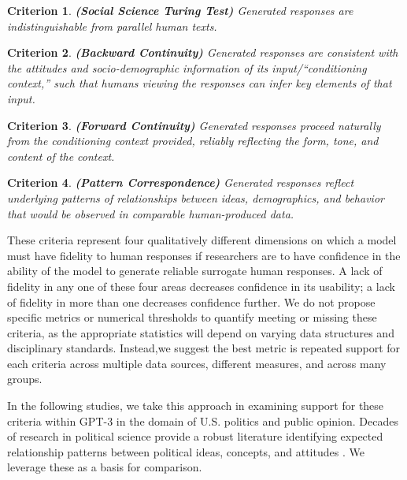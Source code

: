 \documentclass[11pt]{article}
\newtheorem{criterion}{Criterion}
\begin{document}
\begin{criterion}
\textbf{(Social Science Turing Test)} Generated responses are indistinguishable from parallel human texts.
\end{criterion}

\begin{criterion}
\textbf{(Backward Continuity)} Generated responses are consistent with the attitudes and socio-demographic information of its input/``conditioning context,'' such that  humans viewing the responses can infer key elements of that input.
\end{criterion}

\begin{criterion}
\textbf{(Forward Continuity)} Generated responses proceed naturally from the conditioning context provided, reliably reflecting the form, tone, and content of the context.
\end{criterion}

\begin{criterion}
\textbf{(Pattern Correspondence)}
Generated responses reflect underlying patterns of relationships between ideas, demographics, and behavior that would be observed in comparable human-produced data.
\end{criterion}


These criteria represent four qualitatively different dimensions on which a model must have fidelity to human responses if researchers are to have confidence in the ability of the model to generate reliable surrogate human responses. A lack of fidelity in any one of these four areas decreases confidence in its usability; a lack of fidelity in more than one decreases confidence further. We do not propose specific metrics or numerical thresholds to quantify meeting or missing these criteria, as the appropriate statistics will depend on varying data structures and disciplinary standards. Instead,we suggest the best metric is repeated support for each criteria across multiple data sources, different measures, and across many groups.

In the following studies, we take this approach in examining support for these criteria within GPT-3 in the domain of U.S. politics and public opinion. Decades of research in political science provide a robust literature identifying expected relationship patterns between political ideas, concepts, and attitudes \citep{Berelson1954, Campbell1960, HutchingsValentino2004, BurnsGallagher2010, DruckmanLupia2016, Cramer2020}. We leverage these as a basis for comparison.
\end{document}
